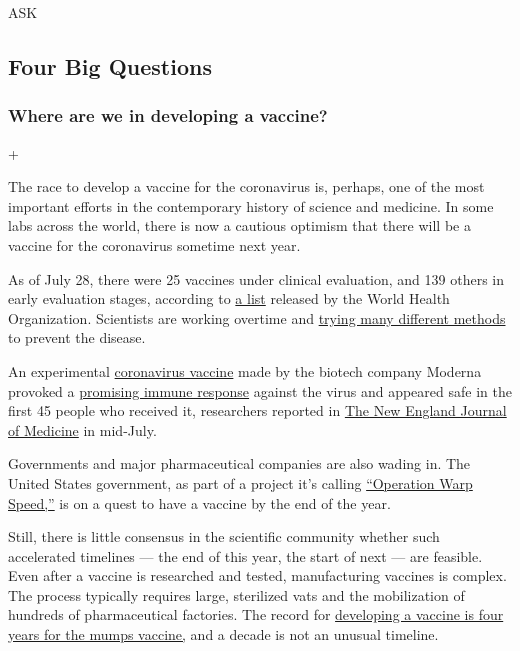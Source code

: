 ASK

\hypertarget{four-big-questions}{%
\subsection{Four Big Questions}\label{four-big-questions}}

\hypertarget{where-are-we-in-developing-a-vaccine}{%
\subsubsection{Where are we in developing a
vaccine?}\label{where-are-we-in-developing-a-vaccine}}

+

The race to develop a vaccine for the coronavirus is, perhaps, one of
the most important efforts in the contemporary history of science and
medicine. In some labs across the world, there is now a cautious
optimism that there will be a vaccine for the coronavirus sometime next
year.

As of July 28, there were 25 vaccines under clinical evaluation, and 139
others in early evaluation stages, according to
\href{https://www.who.int/publications/m/item/draft-landscape-of-covid-19-candidate-vaccines}{a
list} released by the World Health Organization. Scientists are working
overtime and
\href{https://www.nytimes.com/interactive/2020/05/20/science/coronavirus-vaccine-development.html}{trying
many different methods} to prevent the disease.

An experimental
\href{https://www.nytimes.com/interactive/2020/science/coronavirus-vaccine-tracker.html}{coronavirus
vaccine} made by the biotech company Moderna provoked a
\href{https://www.nytimes.com/2020/07/14/health/cornavirus-vaccine-moderna.html}{promising
immune response} against the virus and appeared safe in the first 45
people who received it, researchers reported in
\href{https://www.nejm.org/coronavirus?query=RP}{The New England Journal
of Medicine} in mid-July.

Governments and major pharmaceutical companies are also wading in. The
United States government, as part of a project it's calling
\href{https://www.nytimes.com/2020/06/03/us/politics/coronavirus-vaccine-trump-moderna.html}{``Operation
Warp Speed,''} is on a quest to have a vaccine by the end of the year.

Still, there is little consensus in the scientific community whether
such accelerated timelines --- the end of this year, the start of next
--- are feasible. Even after a vaccine is researched and tested,
manufacturing vaccines is complex. The process typically requires large,
sterilized vats and the mobilization of hundreds of pharmaceutical
factories. The record for
\href{https://www.nytimes.com/interactive/2020/06/09/magazine/covid-vaccine.html}{developing
a vaccine is four years for the mumps vaccine,} and a decade is not an
unusual timeline.

